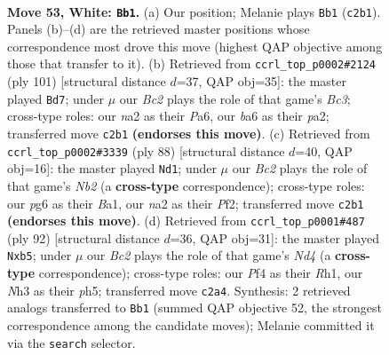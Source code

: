\documentclass[11pt]{article}
\begin{document}
\clearpage

\begin{figure}[p]\centering
\begin{subfigure}{0.46\textwidth}\centering
\resizebox{\linewidth}{!}{%
\newchessgame
\chessboard[
  setfen={6k1/2r2p1p/b5p1/4Pp2/5P2/7N/n1B2KPP/8 w - - 0 53},
  showmover=false,
  pgfstyle=straightmove, color=movearrow, markmove={c2-b1}
]}
\caption{}
\end{subfigure}\hfill
\begin{subfigure}{0.46\textwidth}\centering
\resizebox{\linewidth}{!}{%
\newchessgame
\chessboard[
  setfen={2R5/5pk1/p1b1n1p1/7p/4PP1P/4KP2/P7/8 b - - 27 51},
  showmover=false,
  pgfstyle=straightmove, color=movearrow, markmove={c6-d7}
]}
\caption{}
\end{subfigure}
\\[4pt]
\begin{subfigure}{0.46\textwidth}\centering
\resizebox{\linewidth}{!}{%
\newchessgame
\chessboard[
  setfen={8/8/1r2bpk1/4p1pp/8/R5P1/pN1K1P1P/B7 w - - 12 45},
  showmover=false,
  pgfstyle=straightmove, color=movearrow, markmove={b2-d1}
]}
\caption{}
\end{subfigure}\hfill
\begin{subfigure}{0.46\textwidth}\centering
\resizebox{\linewidth}{!}{%
\newchessgame
\chessboard[
  setfen={8/3r1p2/5kp1/1p5p/1b1N4/4P1P1/4KP2/7R w - - 0 47},
  showmover=false,
  pgfstyle=straightmove, color=movearrow, markmove={d4-b5}
]}
\caption{}
\end{subfigure}
\caption{\textbf{Move 53, White: \texttt{Bb1}.} (a) Our position; Melanie plays \texttt{Bb1} (\texttt{c2b1}). Panels (b)--(d) are the retrieved master positions whose correspondence most drove this move (highest QAP objective among those that transfer to it). (b) Retrieved from \texttt{ccrl\_top\_p0002\#2124} (ply 101) [structural distance $d$=37, QAP obj=35]: the master played \texttt{Bd7}; under $\mu$ our \emph{Bc2} plays the role of that game's \emph{Bc3}; cross-type roles: our \emph{n}a2 as their \emph{P}a6, our \emph{b}a6 as their \emph{p}a2; transferred move \texttt{c2b1} \textbf{(endorses this move)}. (c) Retrieved from \texttt{ccrl\_top\_p0002\#3339} (ply 88) [structural distance $d$=40, QAP obj=16]: the master played \texttt{Nd1}; under $\mu$ our \emph{Bc2} plays the role of that game's \emph{Nb2} (a \textbf{cross-type} correspondence); cross-type roles: our \emph{p}g6 as their \emph{B}a1, our \emph{n}a2 as their \emph{P}f2; transferred move \texttt{c2b1} \textbf{(endorses this move)}. (d) Retrieved from \texttt{ccrl\_top\_p0001\#487} (ply 92) [structural distance $d$=36, QAP obj=31]: the master played \texttt{Nxb5}; under $\mu$ our \emph{Bc2} plays the role of that game's \emph{Nd4} (a \textbf{cross-type} correspondence); cross-type roles: our \emph{P}f4 as their \emph{R}h1, our \emph{N}h3 as their \emph{p}h5; transferred move \texttt{c2a4}. Synthesis: 2 retrieved analogs transferred to \texttt{Bb1} (summed QAP objective 52, the strongest correspondence among the candidate moves); Melanie committed it via the \texttt{search} selector.}
\label{fig:thought-m104}
\end{figure}
\end{document}
